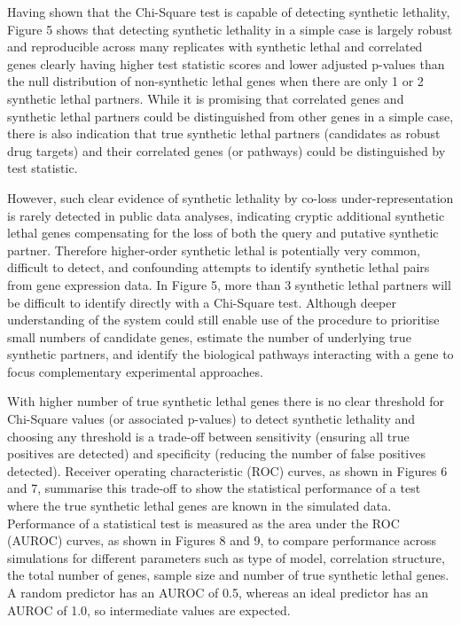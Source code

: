 Having shown that the Chi-Square test is capable of detecting synthetic lethality, Figure 5 shows that detecting synthetic lethality in a simple case is largely robust and reproducible across many replicates with synthetic lethal and correlated genes clearly having higher test statistic scores and lower adjusted p-values than the null distribution of non-synthetic lethal genes when there are only 1 or 2 synthetic lethal partners.  While it is promising that correlated genes and synthetic lethal partners could be distinguished from other genes in a simple case, there is also indication that true synthetic lethal partners (candidates as robust drug targets) and their correlated genes (or pathways) could be distinguished by test statistic.

However, such clear evidence of synthetic lethality by co-loss under-representation is rarely detected in public data analyses, indicating cryptic additional synthetic lethal genes compensating for the loss of both the query and putative synthetic partner.  Therefore higher-order synthetic lethal is potentially very common, difficult to detect, and confounding attempts to identify synthetic lethal pairs from gene expression data.  In Figure 5, more than 3 synthetic lethal partners will be difficult to identify directly with a Chi-Square test.  Although deeper understanding of the system could still enable use of the procedure to prioritise small numbers of candidate genes, estimate the number of underlying true synthetic partners, and identify the biological pathways interacting with a gene to focus complementary experimental approaches.

With higher number of true synthetic lethal genes there is no clear threshold for Chi-Square values (or associated p-values) to detect synthetic lethality and choosing any threshold is a trade-off between sensitivity (ensuring all true positives are detected) and specificity (reducing the number of false positives detected).  Receiver operating characteristic (ROC) curves, as shown in Figures 6 and 7, summarise this trade-off to show the statistical performance of a test where the true synthetic lethal genes are known in the simulated data.  Performance of a statistical test is measured as the area under the ROC (AUROC) curves, as shown in Figures 8 and 9, to compare performance across simulations for different parameters such as type of model, correlation structure, the total number of genes, sample size and number of true synthetic lethal genes.  A random predictor has an AUROC of 0.5, whereas an ideal predictor has an AUROC of 1.0, so intermediate values are expected.

